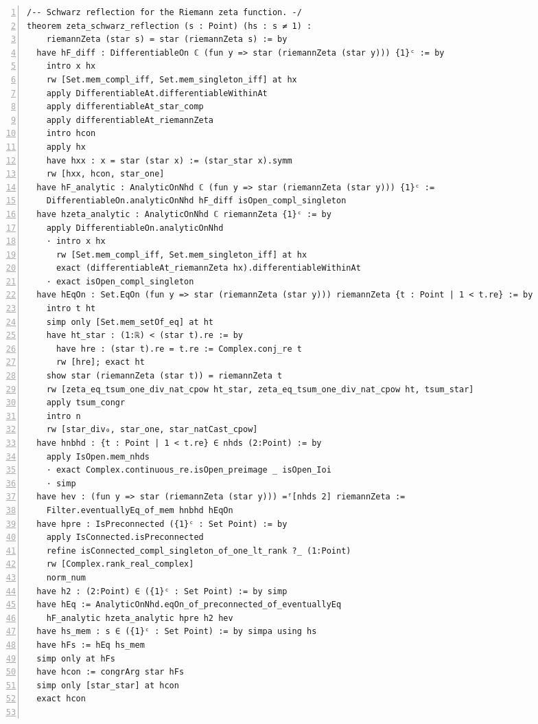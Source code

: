 \documentclass[10pt]{article}
\newcommand{\leansize}{\fontsize{5.5pt}{6.75pt}\selectfont}
\begin{document}
\begin{multicols}{2}
\begin{Verbatim}[numbers=left,firstnumber=1,numbersep=3pt,xleftmargin=2.6em,breaklines=true,breakanywhere=true,breakautoindent=false,breakindent=1.4em,breaksymbolleft={},breakanywheresymbolpre={},fontsize=\leansize]
/-- Schwarz reflection for the Riemann zeta function. -/
theorem zeta_schwarz_reflection (s : Point) (hs : s ≠ 1) :
    riemannZeta (star s) = star (riemannZeta s) := by
  have hF_diff : DifferentiableOn ℂ (fun y => star (riemannZeta (star y))) {1}ᶜ := by
    intro x hx
    rw [Set.mem_compl_iff, Set.mem_singleton_iff] at hx
    apply DifferentiableAt.differentiableWithinAt
    apply differentiableAt_star_comp
    apply differentiableAt_riemannZeta
    intro hcon
    apply hx
    have hxx : x = star (star x) := (star_star x).symm
    rw [hxx, hcon, star_one]
  have hF_analytic : AnalyticOnNhd ℂ (fun y => star (riemannZeta (star y))) {1}ᶜ :=
    DifferentiableOn.analyticOnNhd hF_diff isOpen_compl_singleton
  have hzeta_analytic : AnalyticOnNhd ℂ riemannZeta {1}ᶜ := by
    apply DifferentiableOn.analyticOnNhd
    · intro x hx
      rw [Set.mem_compl_iff, Set.mem_singleton_iff] at hx
      exact (differentiableAt_riemannZeta hx).differentiableWithinAt
    · exact isOpen_compl_singleton
  have hEqOn : Set.EqOn (fun y => star (riemannZeta (star y))) riemannZeta {t : Point | 1 < t.re} := by
    intro t ht
    simp only [Set.mem_setOf_eq] at ht
    have ht_star : (1:ℝ) < (star t).re := by
      have hre : (star t).re = t.re := Complex.conj_re t
      rw [hre]; exact ht
    show star (riemannZeta (star t)) = riemannZeta t
    rw [zeta_eq_tsum_one_div_nat_cpow ht_star, zeta_eq_tsum_one_div_nat_cpow ht, tsum_star]
    apply tsum_congr
    intro n
    rw [star_div₀, star_one, star_natCast_cpow]
  have hnbhd : {t : Point | 1 < t.re} ∈ nhds (2:Point) := by
    apply IsOpen.mem_nhds
    · exact Complex.continuous_re.isOpen_preimage _ isOpen_Ioi
    · simp
  have hev : (fun y => star (riemannZeta (star y))) =ᶠ[nhds 2] riemannZeta :=
    Filter.eventuallyEq_of_mem hnbhd hEqOn
  have hpre : IsPreconnected ({1}ᶜ : Set Point) := by
    apply IsConnected.isPreconnected
    refine isConnected_compl_singleton_of_one_lt_rank ?_ (1:Point)
    rw [Complex.rank_real_complex]
    norm_num
  have h2 : (2:Point) ∈ ({1}ᶜ : Set Point) := by simp
  have hEq := AnalyticOnNhd.eqOn_of_preconnected_of_eventuallyEq
    hF_analytic hzeta_analytic hpre h2 hev
  have hs_mem : s ∈ ({1}ᶜ : Set Point) := by simpa using hs
  have hFs := hEq hs_mem
  simp only at hFs
  have hcon := congrArg star hFs
  simp only [star_star] at hcon
  exact hcon


\end{Verbatim}
\end{multicols}
\end{document}
